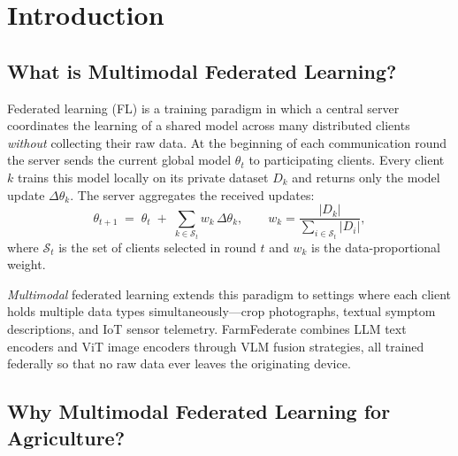 \documentclass[12pt, a4paper, oneside]{Thesis}
\begin{document}
\clearpage
\pagestyle{fancy}
\tableofcontents
\listoffigures
\listoftables

\mainmatter
\pagestyle{fancy}

\chapter{Introduction}
\label{Chapter1}

\section{What is Multimodal Federated Learning?}
Federated learning (FL) is a training paradigm in which a central server coordinates the learning of a shared model across many distributed clients \emph{without} collecting their raw data. At the beginning of each communication round the server sends the current global model $\theta_t$ to participating clients. Every client $k$ trains this model locally on its private dataset $D_k$ and returns only the model update $\Delta \theta_k$. The server aggregates the received updates:
\[
\theta_{t+1} \;=\; \theta_t \;+\; \sum_{k \in \mathcal{S}_t} w_k \,\Delta\theta_k,
\qquad
w_k=\frac{|D_k|}{\sum_{i \in \mathcal{S}_t} |D_i|},
\]
where $\mathcal{S}_t$ is the set of clients selected in round $t$ and $w_k$ is the data-proportional weight.

\textit{Multimodal} federated learning extends this paradigm to settings where each client holds multiple data types simultaneously---crop photographs, textual symptom descriptions, and IoT sensor telemetry. FarmFederate combines LLM text encoders and ViT image encoders through VLM fusion strategies, all trained federally so that no raw data ever leaves the originating device.

\section{Why Multimodal Federated Learning for Agriculture?}
\end{document}
